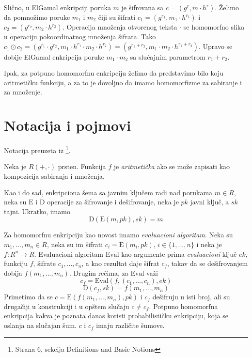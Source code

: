 Sli\v cno, u ElGamal enkripciji poruka $m$ je \v sifrovana sa $c=(g^r,m\cdot h^r)$. \v Zelimo da pomno\v zimo poruke $m_1$ i $m_2$ \v ciji su \v sifrati $c_1 = (g^{r_1},m_1\cdot h^{r_1})$ i $c_2 = (g^{r_2},m_2\cdot h^{r_2})$.
Operacija mno\v zenja otvorenog teksta $\cdot $ se homomorfno slika u operaciju pokoordinatnog mno\v zenja \v sifrata. Tako $c_1\odot c_2 = (g^{r_1}\cdot g^{r_2}, m_1\cdot h^{r_1}\cdot m_2\cdot h^{r_2}) = (g^{r_1 + r_2}, m_1\cdot m_2\cdot h^{r_1+r_2})$. 
Upravo se dobije ElGamal enkripcija poruke $m_1\cdot m_2$ sa slu\v cajnim parametrom $r_1+r_2$.

Ipak, za potpuno homomorfnu enkripciju \v zelimo da predstavimo bilo koju aritmeti\v cku funkciju, a za to je dovoljno da imamo homomorfizme za sabiranje i za mno\v zenje.


\section{Notacija i pojmovi} 
Notacija preuzeta iz \cite{marcolla2022survey} \footnote{Strana 6, sekcija Definitions and Basic Notions}.
\begin{definition}
    Neka je $R(+, \cdot)$ prsten. Funkcija $f$ je \textit{aritmeti\v cka} ako se mo\v ze zapisati kao kompozicija sabiranja i mno\v zenja. 
\end{definition}

Kao i do sad, enkripciona \v sema sa javnim klju\v cem radi nad porukama $m \in R$, neka su $\mathrm{E}$ i $\mathrm{D}$ operacije za \v sifrovanje i de\v sifrovanje, neka je $pk$ javni klju\v c, a $sk$ tajni. Ukratko, imamo
$$\mathrm{D}(\mathrm{E}(m, pk), sk) = m $$

Za homomorfnu enkripciju kao novost imamo \textit{evaluacioni algoritam}. Neka su $m_1, ..., m_n\in R$, neka su im \v sifrati $c_i = \mathrm{E}(m_i, pk)$, $i\in \{1, ..., n\}$ i neka je $f:R^n\rightarrow R$. Evaluacioni algoritam $\mathrm{Eval}$ kao argumente prima \textit{evaluacioni} klju\v c $ek$, funkciju $f$, \v sifrate $c_1, ..., c_n$, a kao rezultat daje \v sifrat $c_f$, takav da se de\v sifrovanjem dobija $f(m_1, ..., m_n)$. Drugim re\v cima, za $\mathrm{Eval}$ va\v zi
$$c_f = \mathrm{Eval}(f, (c_1, ..., c_n), ek)$$
$$\mathrm{D}(c_f, sk) = f(m_1, ..., m_n)$$
Primetimo da se $c = \mathrm{E}(f(m_1, ..., m_n), pk)$ i $c_f$ de\v sifruju u isti broj, ali su druga\v ciji u konstrukciji i u op\v stem slu\v caju $c\neq c_f$. Potpuno homomorfna enkripcija kakva je poznata danas koristi probabilisti\v cku enkripciju, koja se oslanja na slu\v cajan \v sum. $c$ i $c_f$ imaju razli\v cite \v sumove.

